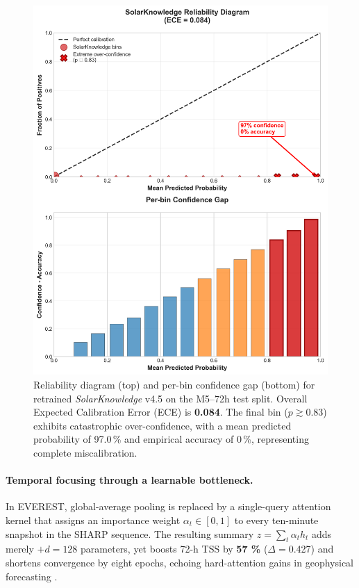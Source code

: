 \begin{figure}[htbp]
  \centering
  \includegraphics[width=.5\linewidth]{figs/skn_reliability.png}
  \caption[Calibration of \textit{SolarKnowledge} on M5--72 h]{%
    Reliability diagram (top) and per-bin confidence gap (bottom) for
    retrained \textit{SolarKnowledge} v4.5 on the M5–72h test split.
    Overall Expected Calibration Error (ECE) is \textbf{0.084}.
    The final bin ($p \gtrsim 0.83$) exhibits catastrophic over-confidence,
    with a mean predicted probability of 97.0\,\% and empirical accuracy
    of 0\,\%, representing complete miscalibration.}
  \label{fig:skn_reliability}
\end{figure}

\paragraph{Temporal focusing through a learnable bottleneck.}
In \textsc{EVEREST}, global-average pooling is replaced by a single-query
attention kernel that assigns an importance weight
$\alpha_t\!\in\![0,1]$ to every ten-minute snapshot in the SHARP sequence.
The resulting summary
$z=\sum_{t}\alpha_{t}h_{t}$ adds merely $+d=128$ parameters, yet boosts
72-h TSS by \textbf{57 \%} ($\Delta\!=$0.427) and shortens convergence by eight
epochs, echoing hard-attention gains in geophysical forecasting
\citep{fomin2023attention}.

